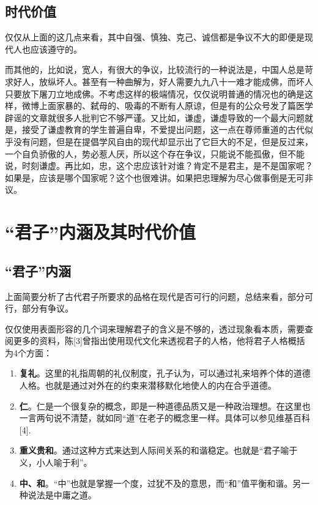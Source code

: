 \documentclass[]{article}
\begin{document}
\hypertarget{header-n52}{%
\subsection{时代价值}\label{header-n52}}

仅仅从上面的这几点来看，其中自强、慎独、克己、诚信都是争议不大的即便是现代人也应该遵守的。

而其他的，比如说，宽人，有很大的争议，比较流行的一种说法是，中国人总是苛求好人，放纵坏人。甚至有一种曲解为，好人需要九九八十一难才能成佛，而坏人只要放下屠刀立地成佛。不考虑这样的极端情况，仅仅说明普通的情况也的确是这样，微博上面家暴的、弑母的、吸毒的不断有人原谅，但是有的公众号发了篇医学辟谣的文章就很多人批判它不够严谨。又比如，谦虚，谦虚导致的一个最大问题就是，接受了谦虚教育的学生普遍自卑，不爱提出问题，这一点在尊师重道的古代似乎没有问题，但是在提倡学风自由的现代却显示出了它巨大的不足，但是反过来，一个自负骄傲的人，势必惹人厌，所以这个存在争议，只能说不能孤傲，但不能说，时刻谦虚。再比如，忠，这个忠应该针对谁？肯定不是君主，是不是国家呢？如果是，应该是哪个国家呢？这个也很难讲。如果把忠理解为尽心做事倒是无可非议。

\hypertarget{header-n57}{%
\section{``君子''内涵及其时代价值}\label{header-n57}}

\hypertarget{header-n58}{%
\subsection{``君子''内涵}\label{header-n58}}

上面简要分析了古代君子所要求的品格在现代是否可行的问题，总结来看，部分可行，部分有争议。

仅仅使用表面形容的几个词来理解君子的含义是不够的，透过现象看本质，需要查阅更多的资料，陈{[}3{]}曾指出使用现代文化来透视君子的人格，他将君子人格概括为4个方面：

\begin{enumerate}
\def\labelenumi{\arabic{enumi}.}
\item
  \textbf{复礼}。这里的礼指周朝的礼仪制度，孔子认为，可以通过礼来培养个体的道德人格。也就是通过对外在的约束来潜移默化地使人的内在合乎道德。
\item
  \textbf{仁}。仁是一个很复杂的概念，即是一种道德品质又是一种政治理想。在这里也一言两句说不清楚，就如同``道''在老子的概念里一样。具体可以参见维基百科{[}4{]}.
\item
  \textbf{重义贵和}。通过这种方式来达到人际间关系的和谐稳定。也就是``君子喻于义，小人喻于利''。
\item
  \textbf{中、和}。``中''也就是掌握一个度，过犹不及的意思，而``和''值平衡和谐。另一种说法是中庸之道。
\end{enumerate}
\end{document}
